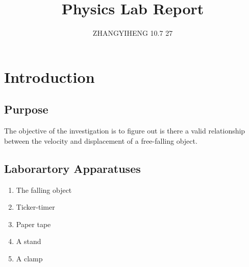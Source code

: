 \documentclass[12pt,a4paper]{article}
\title{Physics Lab Report}
\author{ZHANGYIHENG 10.7 27}
\begin{document}
\maketitle
\begin{center}
\tableofcontents
\end{center}
\setlength{\parindent}{4ex}


\newpage
\section{Introduction}
\subsection{Purpose}
The objective of the investigation is to figure out is there a valid 
relationship between the velocity and displacement of a free-falling object.\par



\subsection{Laborartory Apparatuses}
\begin{enumerate}
    \item The falling object
    \item Ticker-timer
    \item Paper tape
    \item A stand
    \item A clamp
    \linespread{0.5}
\end{enumerate}
\end{document}

